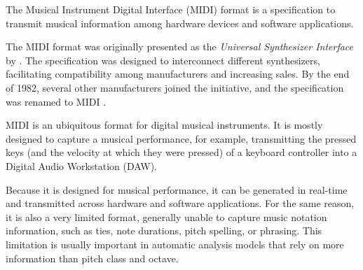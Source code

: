 


The Musical Instrument Digital Interface (MIDI) format is a
specification to transmit musical information among hardware
devices and software applications.

The MIDI format was originally presented as the
\emph{Universal Synthesizer Interface} by
\textcite{smith1981usi}. The specification was
designed to interconnect different synthesizers,
facilitating compatibility among manufacturers and
increasing sales. By the end of 1982, several other
manufacturers joined the initiative, and the specification
was renamed to MIDI \parencite{moog1986midi}.


MIDI is an ubiquitous format for digital musical instruments. It is mostly designed to capture a musical performance, for example, transmitting the pressed keys (and the velocity at which they were pressed) of a keyboard controller into a Digital Audio Workstation (DAW).

Because it is designed for musical performance, it can be generated in real-time and transmitted across hardware and software applications. For the same reason, it is also a very limited format, generally unable to capture music notation information, such as ties, note durations, pitch spelling, or phrasing. This limitation is usually important in automatic analysis models that rely on more information than pitch class and octave.



